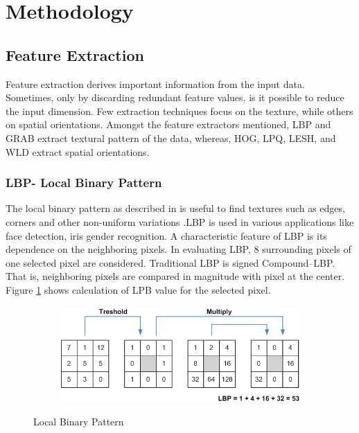 \documentclass[english, 12pt]{article}
\begin{document}

\section{Methodology}

\subsection{Feature Extraction}
\tab Feature extraction derives important information from the input data. Sometimes, only by discarding redundant 
feature values, is it possible to reduce the input dimension. Few extraction techniques focus on the texture, while others on spatial orientations. Amongst the feature extractors mentioned, LBP and GRAB extract textural pattern of the data, whereas, HOG, LPQ, LESH, and WLD extract spatial orientations.


\subsubsection{LBP- Local Binary Pattern}
\tab The local binary pattern as described in \cite{Ahonen:2006:FDL:1175897.1176245} is useful to find textures such as edges, corners and other non-uniform variations .LBP is used in various applications like face detection, iris gender recognition. A characteristic feature of LBP is its dependence on the neighboring pixels. In evaluating LBP, 8 surrounding pixels of one selected pixel are considered. Traditional LBP is signed Compound–LBP. That is, neighboring pixels are compared in magnitude with pixel at the center. Figure \ref{fig:lbp} shows calculation of LPB value for the selected pixel.
\begin{figure}[h]
    \centering
    \begin{subfigure}[b]{0.55\textwidth}
        \includegraphics[width=\textwidth]{lbp.png}
    \end{subfigure}
    \centering
    \caption{Local Binary Pattern}\label{fig:lbp}
\end{figure}
\end{document}
